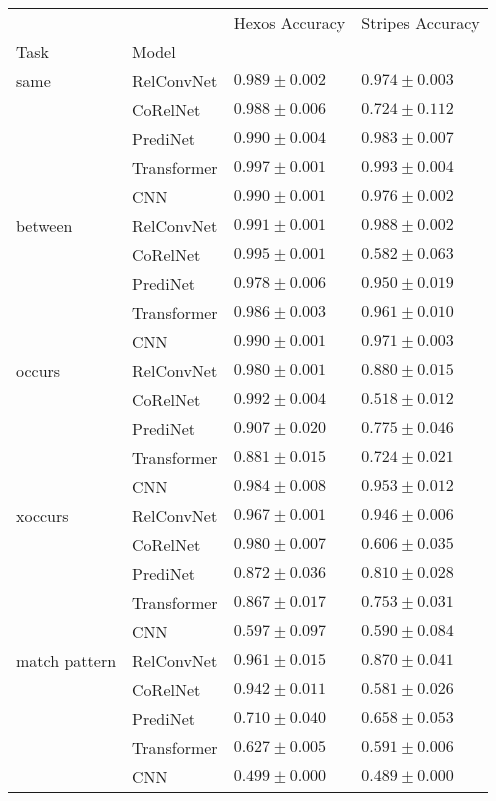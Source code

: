\begin{tabular}{llll}
\toprule
              &     &     Hexos Accuracy &   Stripes Accuracy \\
Task & Model &                    &                    \\
\midrule
same & RelConvNet &  $0.989 \pm 0.002$ &  $0.974 \pm 0.003$ \\
              & CoRelNet &  $0.988 \pm 0.006$ &  $0.724 \pm 0.112$ \\
              & PrediNet &  $0.990 \pm 0.004$ &  $0.983 \pm 0.007$ \\
              & Transformer &  $0.997 \pm 0.001$ &  $0.993 \pm 0.004$ \\
              & CNN &  $0.990 \pm 0.001$ &  $0.976 \pm 0.002$ \\\hline
between & RelConvNet &  $0.991 \pm 0.001$ &  $0.988 \pm 0.002$ \\
              & CoRelNet &  $0.995 \pm 0.001$ &  $0.582 \pm 0.063$ \\
              & PrediNet &  $0.978 \pm 0.006$ &  $0.950 \pm 0.019$ \\
              & Transformer &  $0.986 \pm 0.003$ &  $0.961 \pm 0.010$ \\
              & CNN &  $0.990 \pm 0.001$ &  $0.971 \pm 0.003$ \\\hline
occurs & RelConvNet &  $0.980 \pm 0.001$ &  $0.880 \pm 0.015$ \\
              & CoRelNet &  $0.992 \pm 0.004$ &  $0.518 \pm 0.012$ \\
              & PrediNet &  $0.907 \pm 0.020$ &  $0.775 \pm 0.046$ \\
              & Transformer &  $0.881 \pm 0.015$ &  $0.724 \pm 0.021$ \\
              & CNN &  $0.984 \pm 0.008$ &  $0.953 \pm 0.012$ \\\hline
xoccurs & RelConvNet &  $0.967 \pm 0.001$ &  $0.946 \pm 0.006$ \\
              & CoRelNet &  $0.980 \pm 0.007$ &  $0.606 \pm 0.035$ \\
              & PrediNet &  $0.872 \pm 0.036$ &  $0.810 \pm 0.028$ \\
              & Transformer &  $0.867 \pm 0.017$ &  $0.753 \pm 0.031$ \\
              & CNN &  $0.597 \pm 0.097$ &  $0.590 \pm 0.084$ \\\hline
match pattern & RelConvNet &  $0.961 \pm 0.015$ &  $0.870 \pm 0.041$ \\
              & CoRelNet &  $0.942 \pm 0.011$ &  $0.581 \pm 0.026$ \\
              & PrediNet &  $0.710 \pm 0.040$ &  $0.658 \pm 0.053$ \\
              & Transformer &  $0.627 \pm 0.005$ &  $0.591 \pm 0.006$ \\
              & CNN &  $0.499 \pm 0.000$ &  $0.489 \pm 0.000$ \\
\bottomrule
\end{tabular}
